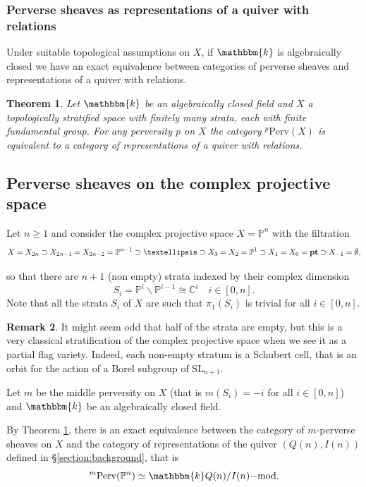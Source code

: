 \documentclass[11pt]{amsart}
\newtheorem{theorem}{Theorem}[section]
\theoremstyle{definition}
\newtheorem{remark}[theorem]{Remark}
\newcommand{\C}{\mathbb{C}}
\newcommand{\kk}{\mathbbm{k}}
\newcommand{\PP}{\mathbb{P}}
\newcommand{\cat}[1]{\mathrm{#1}}
\renewcommand{\mod}[1]{{#1}\mathrm{-mod}}
\newcommand{\perv}[2]{{}^{#1}\cat{Perv}\!\left(#2\right)}
\newcommand{\pt}{{\bf pt}}
\begin{document}
\subsubsection{Perverse sheaves as representations of a quiver with relations}

Under suitable topological assumptions on $X$, if $\kk$ is algebraically closed we have an exact equivalence between categories of perverse sheaves and representations of a quiver with relations.

\begin{theorem}\cite[Corollary 5.3 and \S5.1]{MR4349392} \label{thm:rep_perv_sh}
Let $\kk$ be an algebraically closed field and $X$ a topologically stratified space with finitely many strata, each with finite fundamental group. For any perversity $p$ on $X$ the category $\perv{p}{X}$ is equivalent to a category of representations of a quiver with relations.
\end{theorem}

\subsection{Perverse sheaves on the complex projective space}

Let $n\geq1$ and consider the complex projective space $X=\PP^n$ with the filtration
\[
X=X_{2n}\supset X_{2n-1}=X_{2n-2}=\PP^{n-1}\supset\ldots\supset X_3=X_2=\PP^1\supset X_1=X_0=\pt\supset X_{-1}=\emptyset,
\]

so that there are $n+1$ (non empty) strata  indexed by their complex dimension
\[
S_i=\PP^i\smallsetminus\PP^{i-1}\cong\C^i \quad i\in[0,n].
\]
Note that all the strata $S_i$ of $X$ are such that $\pi_1(S_i)$ is trivial for all $i\in[0,n]$.

\begin{remark}
    It might seem odd that half of the strata are empty, but this is a very classical stratification of the complex projective space when we see it as a partial flag variety. Indeed, each non-empty stratum is a Schubert cell, that is an orbit for the action of a Borel subgroup of $\mathrm{SL}_{n+1}$.
\end{remark}

Let $m$ be the middle perversity on $X$ (that is $m(S_i)=-i$ for all $i\in[0,n]$) and $\kk$ be an algebraically closed field. 

By Theorem \ref{thm:rep_perv_sh}, there is an exact equivalence between the category of $m$-perverse sheaves on $X$ and the category of representations of the quiver $(Q(n),I(n))$ defined in \S\ref{section:background}, that is
\[
\perv{m}{\PP^n}\simeq \mod{\kk Q(n)/I(n)}.
\]
\end{document}
